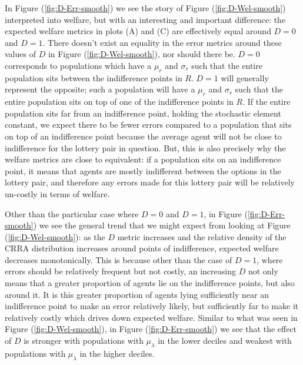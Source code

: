 \documentclass[11pt,a4paper]{report}
\begin{document}
In Figure (\ref{fig:D-Err-smooth}) we see the story of Figure (\ref{fig:D-Wel-smooth}) interpreted into welfare, but with an interesting and important difference: the expected welfare metrics in plots (A) and (C) are effectively equal around $D=0$ and $D=1$.
There doesn't exist an equality in the error metrics around these values of $D$ in Figure (\ref{fig:D-Wel-smooth}), nor should there be.
$D=0$ corresponds to populations which have a $\mu_r$ and $\sigma_r$ such that the entire population sits between the indifference points in $R$.
$D=1$ will generally{\footnotemark} represent the opposite; such a population will have a $\mu_r$ and $\sigma_r$ such that the entire population sits on top of one of the indifference points in $R$.
If the entire population sits far from an indifference point, holding the stochastic element constant, we expect there to be fewer errors compared to a population that sits on top of an indifference point because the average agent will not be close to indifference for the lottery pair in question.
But, this is also precisely why the welfare metrics are close to equivalent: if a population sits on an indifference point, it means that agents are mostly indifferent between the options in the lottery pair, and therefore any errors made for this lottery pair will be relatively un-costly in terms of welfare.

\addtocounter{footnote}{-1}

Other than the particular case where $D=0$ and $D=1$, in Figure (\ref{fig:D-Err-smooth}) we see the general trend that we might expect from looking at Figure (\ref{fig:D-Wel-smooth}): as the $D$ metric increases and the relative density of the CRRA distribution increases around points of indifference, expected welfare decreases monotonically.
This is because other than the case of $D=1$, where errors should be relatively frequent but not costly, an increasing $D$ not only means that a greater proportion of agents lie on the indifference points, but also around it.
It is this greater proportion of agents lying sufficiently near an indifference point to make an error relatively likely, but sufficiently far to make it relatively costly which drives down expected welfare.
Similar to what was seen in Figure (\ref{fig:D-Wel-smooth}), in Figure (\ref{fig:D-Err-smooth}) we see that the effect of $D$ is stronger with populations with $\mu_\lambda$ in the lower deciles and weakest with populations with $\mu_\lambda$ in the higher deciles.
\end{document}
